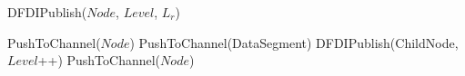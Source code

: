 \begin{algorithm}
\caption{DFDIPublish($Node$, $Level$, $L_r$)}
\label{alg:DFDIPublish}
\begin{algorithmic}[1]

\STATE PushToChannel($Node$)  
        \STATE PushToChannel(DataSegment)
    \ENDFOR
\ELSE
        \STATE DFDIPublish(ChildNode, $Level$++)
            \STATE PushToChannel($Node$)
        \ENDIF
    \ENDFOR
\ENDIF
\end{algorithmic}
\end{algorithm}






